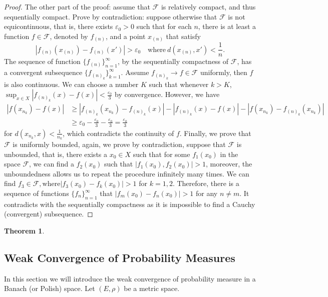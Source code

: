 \documentclass[11pt,english]{smfart}
\newtheorem{theorem}{Theorem}[subsection]
\newcommand{\mc}{\mathcal}
\begin{document}
\begin{proof}
    The other part of the proof: assume that $\mc{F}$ is relatively compact, and thus sequentially compact. Prove by contradiction: suppose otherwise that $\mc{F}$ is not equicontinuous, that is, there exists $\varepsilon_0 > 0$ such that for each $n$, there is at least a function $f\in \mc{F}$, denoted by $f_{(n)}$, and a point $x_{(n)}$ that satisfy $$|f_{(n)}(x_{(n)}) - f_{(n)}(x')| > \varepsilon_0 \quad \text{where} \ d(x_{(n)}, x') < \frac{1}{n}.$$ 
    The sequence of function $\{f_{(n)}\}_{n=1}^\infty$, by the sequentially compactness of $\mc{F}$, has a convergent subsequence $\{f_{(n)_k}\}_{k=1}^\infty$. Assume $f_{(n)_k} \rightarrow f \in \mc{F}$ uniformly, then $f$ is also continuous. We can choose a number $K$ such that whenever $k>K$, $\sup_{x\in X} |f_{(n)_k}(x) - f(x)| < \frac{\varepsilon_0}{3}$ by convergence. However, we have \begin{align*}
        |f(x_{n_k}) - f(x)| &\geq |f_{(n)_k}(x_{n_k}) - f_{(n)_k}(x)| - |f_{(n)_k}(x) - f(x)| - |f(x_{n_k}) - f_{(n)_k}(x_{n_k})| \\
        &\geq \varepsilon_0 - \frac{\varepsilon_0}{3} -\frac{\varepsilon_0}{3} = \frac{\varepsilon_0}{3}
    \end{align*}
    for $d(x_{n_k},x) < \frac{1}{n_k}$, which contradicts the continuity of $f$. Finally, we prove that $\mc{F}$ is uniformly bounded, again, we prove by contradiction, suppose that $\mc{F}$ is unbounded, that is, there exists a $x_0 \in X$ such that for some $f_1(x_0)$ in the space $\mc{F}$, we can find a $f_2(x_0) $ such that $|f_1(x_0),f_2(x_0)| > 1$, moreover, the unboundedness allows us to repeat the procedure infinitely many times. We can find $f_3 \in \mc{F}, \text{where} |f_3(x_0) - f_k(x_0)| > 1 $ for $k =1,2$. Therefore, there is a sequence of functions $\{f_n\}_{n=1}^\infty$ that $|f_m(x_0) - f_n(x_0)| > 1$ for any $n\neq m$. It contradicts with the sequentially compactness as it is impossible to find a Cauchy (convergent) subsequence.
\end{proof}


\begin{theorem}
    
\end{theorem}

\subsection{Weak Convergence of Probability Measures} 
In this section we will introduce the weak convergence of probability measure in a Banach (or Polish) space. Let $(E,\rho)$ be a metric space.
\end{document}
